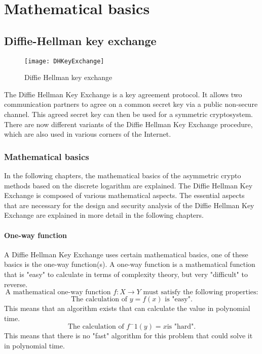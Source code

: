 \chapter{Mathematical basics}
\section{Diffie-Hellman key exchange}
\begin{center}
\begin{figure}[!htb]
    \centering
\texttt{[image: DHKeyExchange]}
    \caption{Diffie Hellman key exchange}
    \label{fig:DHKeyExchange}
\end{figure}
\end{center}
\newline
The Diffie Hellman Key Exchange is a key agreement protocol. It allows two communication partners to agree on a common secret key via a public non-secure channel. This agreed secret key can then be used for a symmetric cryptosystem.
There are now different variants of the Diffie Hellman Key Exchange procedure, which are also used in various corners of the Internet.\cite{Diffie-Hellman_key_exchange}
\subsection{Mathematical basics}
In the following chapters, the mathematical basics of the asymmetric crypto methods based on the discrete logarithm are explained. The Diffie Hellman Key Exchange is composed of various mathematical aspects. The essential aspects that are necessary for the design and security analysis of the Diffie Hellman Key Exchange are explained in more detail in the following chapters.
\subsubsection{One-way function}
A Diffie Hellman Key Exchange uses certain mathematical basics, one of these basics is the one-way function(s). 
A one-way function is a mathematical function that is "easy" to calculate in terms of complexity theory, but very "difficult" to reverse. 
\begin{displaymath} \text{A mathematical one-way function }  f : X \to Y  \text{ must satisfy the following properties:}\end{displaymath}
    \begin{displaymath}
    \text{The calculation of }  y = f(x)  \text{ is "easy".}
    \end{displaymath}
This means that an algorithm exists that can calculate the value in polynomial time.
\newline
\begin{displaymath}
\text{The calculation of } f^-1(y) = x \text{is "hard".}
\end{displaymath}
This means that there is no "fast" algorithm for this problem that could solve it in polynomial time.\cite{Robshaw2011}
